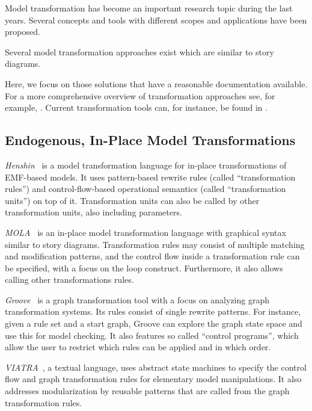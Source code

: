 Model transformation has become an important research topic during the last years.
Several concepts and tools with different scopes and applications have been proposed.

Several model transformation approaches exist which are similar to story diagrams.

Here, we focus on those solutions that have a reasonable documentation available.
For a more comprehensive overview of transformation approaches see, for example, \cite{Czarnecki06}.
Current transformation tools can, for instance, be found in \cite{TTC2010}.

\subsection{Endogenous, In-Place Model Transformations}

\emph{Henshin}~\cite{henshin2} is a model transformation language for in-place transformations of EMF-based models.
It uses pattern-based rewrite rules (called ``transformation rules'') and control-flow-based operational semantics (called ``transformation units'') on top of it.
Transformation units can also be called by other transformation units, also including parameters.

\emph{MOLA}~\cite{mola} is an in-place model transformation language with graphical syntax similar to story diagrams.
Transformation rules may consist of multiple matching and modification patterns, and the control flow inside a transformation rule can be specified, with a focus on the loop construct.
Furthermore, it also allows calling other transformations rules. %

\emph{Groove}~\cite{Ren04a}  is a graph transformation tool with a focus on analyzing graph transformation systems.
Its rules consist of single rewrite patterns.
For instance, given a rule set and a start graph, Groove can explore the graph state space and use this for model checking.
It also features so called ``control programs'', which allow the user to restrict which rules can be applied and in which order.

\emph{VIATRA}~\cite{viatra}, a textual language, uses abstract state machines to specify the control flow and graph transformation rules for elementary model manipulations.
It also addresses modularization by reusable patterns that are called from the graph transformation rules. 

